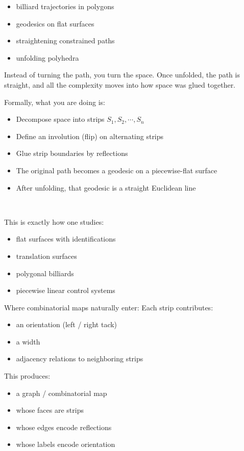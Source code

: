 \begin{itemize}
\item billiard trajectories in polygons
\item geodesics on flat surfaces
\item straightening constrained paths
\item unfolding polyhedra
\end{itemize}


Instead of turning the path, you turn the space. Once unfolded, the path is straight, and all the complexity moves into how space was glued together.

Formally, what you are doing is:

\begin{itemize}
\item Decompose space into strips $ S_1, S_2, \cdots , S_n $
\item Define an involution (flip) on alternating strips
\item Glue strip boundaries by reflections
\item The original path becomes a geodesic on a piecewise-flat surface
\item After unfolding, that geodesic is a straight Euclidean line
\end{itemize}
​	
 
This is exactly how one studies:
\begin{itemize}
\item flat surfaces with identifications
\item translation surfaces
\item polygonal billiards
\item piecewise linear control systems
\end{itemize}


Where combinatorial maps naturally enter:
Each strip contributes:

\begin{itemize}
\item an orientation (left / right tack)
\item a width
\item adjacency relations to neighboring strips
\end{itemize}

This produces:
\begin{itemize}

\item a graph / combinatorial map
\item whose faces are strips
\item whose edges encode reflections
\item whose labels encode orientation
\end{itemize}


